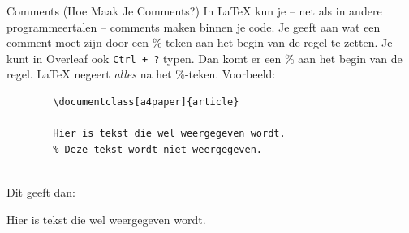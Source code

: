 \begin{frame}[fragile]{Comments (Hoe Maak Je Comments?)}
    In \LaTeX{} kun je -- net als in andere programmeertalen -- comments maken binnen je code. 
    Je geeft aan wat een comment moet zijn door een \%-teken aan het begin van de regel te zetten. 
    Je kunt in Overleaf ook \;\texttt{Ctrl + ?} \; typen.
    Dan komt er een \% aan het begin van de regel. \pause \LaTeX{} negeert \emph{alles} na het \%-teken. 
    Voorbeeld:
    \begin{verbatim}
        \documentclass[a4paper]{article}
        
        Hier is tekst die wel weergegeven wordt. 
        % Deze tekst wordt niet weergegeven. 
        
    \end{verbatim}
    \pause 
    Dit geeft dan:
    \begin{tcolorbox}[boxrule=0.5pt, colback=white]
        Hier is tekst die wel weergegeven wordt. 
    \end{tcolorbox}
\end{frame}

